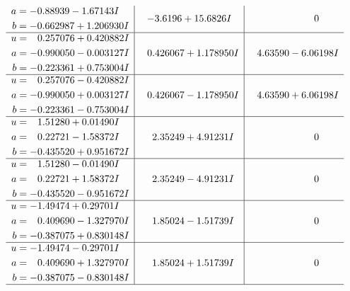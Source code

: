 \documentclass[1p]{elsarticle_modified}
\theoremstyle{definition}
\begin{document}
$$\begin{array}{c|c|c}
\begin{aligned}
a &= -0.88939 - 1.67143 I \\
b &= -0.662987 + 1.206930 I\end{aligned}
 & -3.6196 + 15.6826 I & \phantom{-0.000000 } 0 \\ \hline\begin{aligned}
u &= \phantom{-}0.257076 + 0.420882 I \\
a &= -0.990050 - 0.003127 I \\
b &= -0.223361 + 0.753004 I\end{aligned}
 & \phantom{-}0.426067 + 1.178950 I & \phantom{-}4.63590 - 6.06198 I \\ \hline\begin{aligned}
u &= \phantom{-}0.257076 - 0.420882 I \\
a &= -0.990050 + 0.003127 I \\
b &= -0.223361 - 0.753004 I\end{aligned}
 & \phantom{-}0.426067 - 1.178950 I & \phantom{-}4.63590 + 6.06198 I \\ \hline\begin{aligned}
u &= \phantom{-}1.51280 + 0.01490 I \\
a &= \phantom{-}0.22721 - 1.58372 I \\
b &= -0.435520 + 0.951672 I\end{aligned}
 & \phantom{-}2.35249 + 4.91231 I & \phantom{-0.000000 } 0 \\ \hline\begin{aligned}
u &= \phantom{-}1.51280 - 0.01490 I \\
a &= \phantom{-}0.22721 + 1.58372 I \\
b &= -0.435520 - 0.951672 I\end{aligned}
 & \phantom{-}2.35249 - 4.91231 I & \phantom{-0.000000 } 0 \\ \hline\begin{aligned}
u &= -1.49474 + 0.29701 I \\
a &= \phantom{-}0.409690 - 1.327970 I \\
b &= -0.387075 + 0.830148 I\end{aligned}
 & \phantom{-}1.85024 - 1.51739 I & \phantom{-0.000000 } 0 \\ \hline\begin{aligned}
u &= -1.49474 - 0.29701 I \\
a &= \phantom{-}0.409690 + 1.327970 I \\
b &= -0.387075 - 0.830148 I\end{aligned}
 & \phantom{-}1.85024 + 1.51739 I & \phantom{-0.000000 } 0\\
 \hline 
 \end{array}$$\newpage\newpage\renewcommand{\arraystretch}{1}
\end{document}
